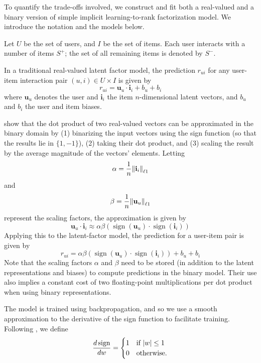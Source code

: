\documentclass[sigchi]{acmart}
\newcommand\symUserSet{U}
\newcommand\symItemSet{I}
\newcommand\symUserInteractionSet{S}
\DeclareMathOperator{\sign}{sign}
\renewcommand\vec{\mathbf}
\begin{document}
To quantify the trade-offs involved, we construct and fit both a real-valued and a binary version of simple implicit learning-to-rank factorization model. We introduce the notation and the models below.

Let $\symUserSet$ be the set of users, and $\symItemSet$ be the set of items. Each user interacts with a number of items $\symUserInteractionSet^+$; the set of all remaining items is denoted by $\symUserInteractionSet^-$.

In a traditional real-valued latent factor model, the prediction $r_{ui}$ for any user-item interaction pair $(u, i) \in \symUserSet \times \symItemSet$ is given by
\begin{equation}
r_{ui} = \vec{u}_u \cdot \vec{i}_i + b_u + b_i
\end{equation}
where $\vec{u}_u$ denotes the user and $\vec{i}_i$ the item $n$-dimensional latent vectors, and $b_u$ and $b_i$ the user and item biases.

\citet{rastegari2016xnor} show that the dot product of two real-valued vectors can be approximated in the binary domain by (1) binarizing the input vectors using the sign function (so that the results lie in $\{1, -1\}$), (2) taking their dot product, and (3) scaling the result by the average magnitude of the vectors' elements. Letting
\begin{equation}
\alpha = \frac{1}{n}\norm{\vec{i}_{i}}_{\ell1}
\end{equation}
and
\begin{equation}
\beta = \frac{1}{n}\norm{\vec{u}_{u}}_{\ell1}
\end{equation}
represent the scaling factors, the approximation is given by
\newcommand\binaryApproximation{ \alpha \beta\left(\sign(\vec{u}_u) \cdot \sign(\vec{i}_i)\right)}
\begin{equation}
\vec{u}_u \cdot \vec{i}_i \approx \binaryApproximation
\end{equation}
Applying this to the latent-factor model, the prediction for a user-item pair is given by
\begin{equation}
r_{ui} = \binaryApproximation + b_u + b_i
\end{equation}
Note that the scaling factors $\alpha$ and $\beta$ need to be stored (in addition to the latent representations and biases) to compute predictions in the binary model. Their use also implies a constant cost of two floating-point multiplications per dot product when using binary representations.

The model is trained using backpropagation, and so we use a smooth approximation to the derivative of the sign function to facilitate training. Following \citet{courbariaux2016binarized}, we define
\begin{equation}
  \frac{d\sign}{dw}=
  \begin{cases}
    1 & \text{if}\ \abs{w} \leq 1 \\
    0 & \text{otherwise}.
  \end{cases}
\end{equation}
\end{document}
